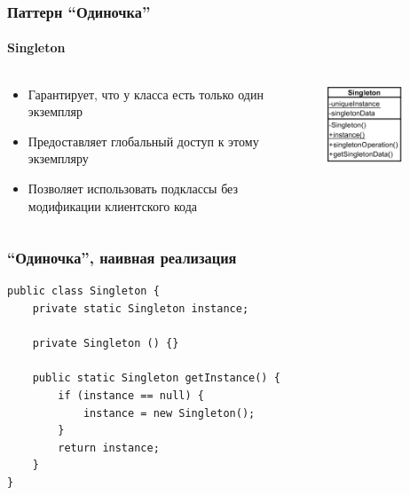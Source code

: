 \documentclass[xetex,mathserif,serif]{beamer}
\begin{document}
	\begin{frame}
		\frametitle{Паттерн ``Одиночка''}
		\framesubtitle{Singleton}
		\begin{columns}
			\begin{column}{0.6\textwidth}
				\begin{itemize}
					\item Гарантирует, что у класса есть только один экземпляр
					\item Предоставляет глобальный доступ к этому экземпляру
					\item Позволяет использовать подклассы без модификации клиентского кода
				\end{itemize}
			\end{column}
			\begin{column}{0.4\textwidth}
				\begin{center}
					\includegraphics[width=0.6\textwidth]{singleton.png}
				\end{center}
			\end{column}
		\end{columns}
	\end{frame}

	\begin{frame}[fragile]
		\frametitle{``Одиночка'', наивная реализация}
		\begin{verbatim}
public class Singleton {
    private static Singleton instance;

    private Singleton () {}

    public static Singleton getInstance() {
        if (instance == null) {
            instance = new Singleton();
        }
        return instance;
    }
}
		\end{verbatim}
	\end{frame}
\end{document}
